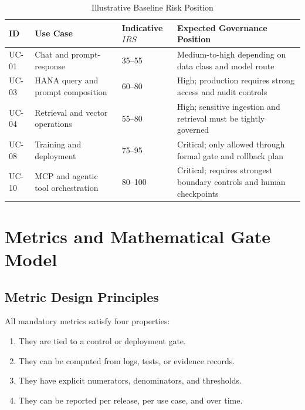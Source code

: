 \documentclass[11pt,a4paper]{article}
\begin{document}
\begin{table}[H]
\centering
\caption{Illustrative Baseline Risk Position}
\begin{tabularx}{\textwidth}{P{0.08\textwidth}Y P{0.14\textwidth}P{0.14\textwidth}}
\toprule
\textbf{ID} & \textbf{Use Case} & \textbf{Indicative \(IRS\)} & \textbf{Expected Governance Position} \\
\midrule
UC-01 & Chat and prompt-response & 35--55 & Medium-to-high depending on data class and model route \\
UC-03 & HANA query and prompt composition & 60--80 & High; production requires strong access and audit controls \\
UC-04 & Retrieval and vector operations & 55--80 & High; sensitive ingestion and retrieval must be tightly governed \\
UC-08 & Training and deployment & 75--95 & Critical; only allowed through formal gate and rollback plan \\
UC-10 & MCP and agentic tool orchestration & 80--100 & Critical; requires strongest boundary controls and human checkpoints \\
\bottomrule
\end{tabularx}
\end{table}

\section{Metrics and Mathematical Gate Model}

\subsection{Metric Design Principles}

All mandatory metrics satisfy four properties:

\begin{enumerate}[nosep]
    \item They are tied to a control or deployment gate.
    \item They can be computed from logs, tests, or evidence records.
    \item They have explicit numerators, denominators, and thresholds.
    \item They can be reported per release, per use case, and over time.
\end{enumerate}
\end{document}
